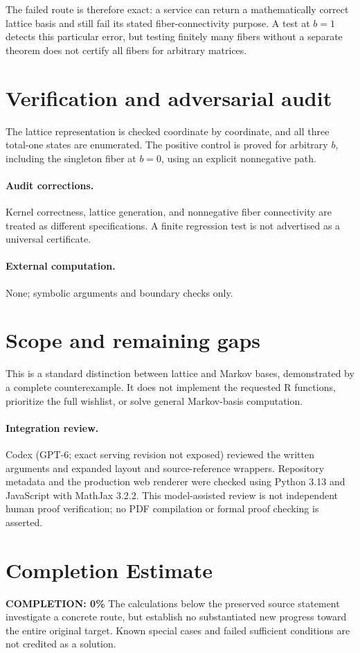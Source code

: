 \documentclass[11pt]{article}
\begin{document}
The failed route is therefore exact: a service can return a mathematically correct lattice basis and still fail its stated fiber-connectivity purpose. A test at $b=1$ detects this particular error, but testing finitely many fibers without a separate theorem does not certify all fibers for arbitrary matrices.
\section{Verification and adversarial audit}
The lattice representation is checked coordinate by coordinate, and all three total-one states are enumerated. The positive control is proved for arbitrary $b$, including the singleton fiber at $b=0$, using an explicit nonnegative path.
\paragraph{Audit corrections.} Kernel correctness, lattice generation, and nonnegative fiber connectivity are treated as different specifications. A finite regression test is not advertised as a universal certificate.
\paragraph{External computation.} None; symbolic arguments and boundary checks only.
\section{Scope and remaining gaps}
This is a standard distinction between lattice and Markov bases, demonstrated by a complete counterexample. It does not implement the requested R functions, prioritize the full wishlist, or solve general Markov-basis computation.
\paragraph{Integration review.} Codex (GPT-6; exact serving revision not exposed) reviewed the written arguments and expanded layout and source-reference wrappers. Repository metadata and the production web renderer were checked using Python 3.13 and JavaScript with MathJax 3.2.2. This model-assisted review is not independent human proof verification; no PDF compilation or formal proof checking is asserted.

\section{Completion Estimate}
\noindent\textbf{COMPLETION: 0\%}
The calculations below the preserved source statement investigate a concrete route,
but establish no substantiated new progress toward the entire original target.
Known special cases and failed sufficient conditions are not credited as a solution.
\end{document}
